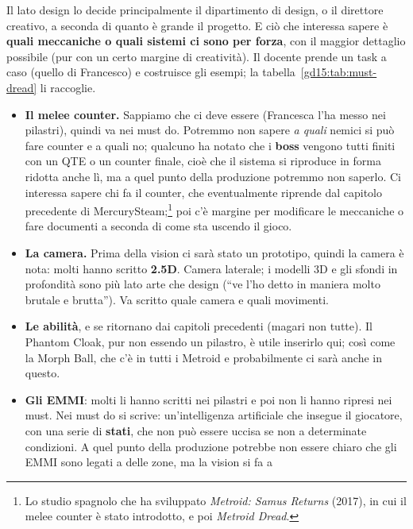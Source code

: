Il lato design lo decide principalmente il dipartimento di design, o il
direttore creativo, a seconda di quanto è grande il progetto. E ciò che
interessa sapere è \textbf{quali meccaniche o quali sistemi ci sono per
forza}, con il maggior dettaglio possibile (pur con un certo margine di
creatività). Il docente prende un task a caso (quello di Francesco) e
costruisce gli esempi; la tabella~\ref{gd15:tab:must-dread} li raccoglie.

\begin{itemize}
  \item \textbf{Il melee counter.} Sappiamo che ci deve essere (Francesca
        l'ha messo nei pilastri), quindi va nei must do. Potremmo non
        sapere \emph{a quali} nemici si può fare counter e a quali no; qualcuno
        ha notato che i \textbf{boss} vengono tutti finiti con un QTE o un
        counter finale, cioè che il sistema si riproduce in forma ridotta
        anche lì, ma a quel punto della produzione potremmo non saperlo. Ci
        interessa sapere chi fa il counter, che eventualmente riprende dal
        capitolo precedente di MercurySteam;\footnote{Lo studio spagnolo che
        ha sviluppato \emph{Metroid: Samus Returns} (2017), in cui il melee
        counter è stato introdotto, e poi \emph{Metroid Dread}.} poi c'è
        margine per modificare le meccaniche o fare documenti a seconda di
        come sta uscendo il gioco.
  \item \textbf{La camera.} Prima della vision ci sarà stato un prototipo,
        quindi la camera è nota: molti hanno scritto \textbf{2.5D}. Camera
        laterale; i modelli 3D e gli sfondi in profondità sono più lato arte
        che design (``ve l'ho detto in maniera molto brutale e brutta''). Va
        scritto quale camera e quali movimenti.
  \item \textbf{Le abilità}, e se ritornano dai capitoli precedenti (magari
        non tutte). Il Phantom Cloak, pur non essendo un pilastro, è utile
        inserirlo qui; così come la Morph Ball, che c'è in tutti i Metroid
        e probabilmente ci sarà anche in questo.
  \item \textbf{Gli EMMI}: molti li hanno scritti nei pilastri e poi non li
        hanno ripresi nei must. Nei must do si scrive: un'intelligenza
        artificiale che insegue il giocatore, con una serie di
        \textbf{stati}, che non può essere uccisa se non a determinate
        condizioni. A quel punto della produzione potrebbe non essere chiaro
        che gli EMMI sono legati a delle zone, ma la vision si fa a

\end{itemize}
